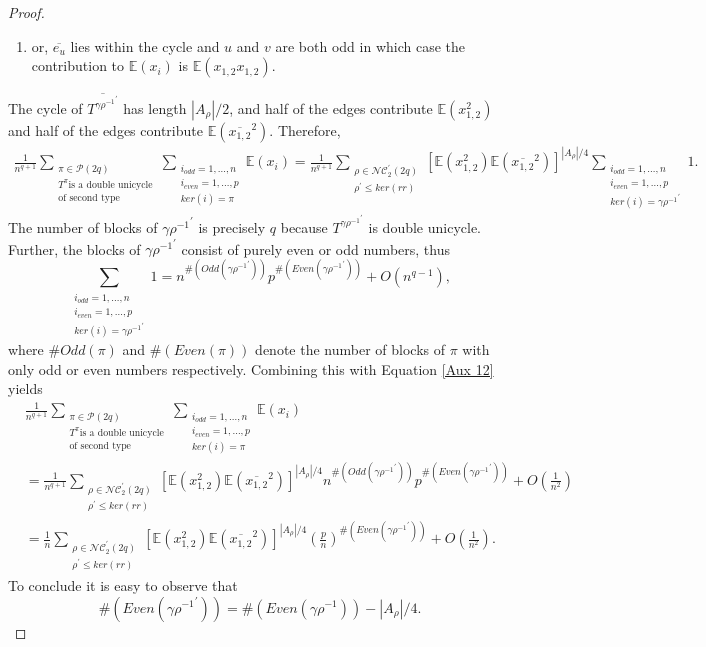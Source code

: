 \documentclass{article}
\theoremstyle{definition}
\newcommand{\E}{\mathbb{E}}
\newcommand{\cP}{\mathcal{P}}
\newcommand{\NC}{\mathcal{NC}}
\begin{document}
{\begin{proof}
\begin{enumerate}
    \item or, $\overline{e_u}$ lies within the cycle and $u$ and $v$ are both odd in which case the contribution to $\mathbb{E}(x_i)$ is $\mathbb{E}(x_{1,2}x_{1,2})$.
\end{enumerate}
The cycle of $\overline{T^{{\gamma\rho^{-1}}^\prime}}$ has length $|A_\rho|/2$, and half of the edges contribute $\mathbb{E}(x_{1,2}^2)$ and half of the edges contribute $\mathbb{E}(\overline{x_{1,2}}^2)$. Therefore,
\begin{align}\label{Aux 12}
\frac{1}{n^{q+1}}\sum_{\substack{\pi\in \cP(2q)\\ T^\pi \text{is a double unicycle} \\ \text{of second type} }}\sum_{\substack{i_{odd}=1,\dots,n \\ i_{even}=1,\dots,p \\ ker(i)=\pi}}\E(x_i) 
=\frac{1}{n^{q+1}}\sum_{\substack{\rho\in \NC_2^\prime(2q) \\ \rho^\prime \leq ker(rr)}}[\mathbb{E}(x_{1,2}^2)\mathbb{E}(\overline{x_{1,2}}^2)]^{|A_\rho|/4}\sum_{\substack{i_{odd}=1,\dots,n \\ i_{even}=1,\dots,p \\ ker(i)={\gamma\rho^{-1}}^\prime}}1.
\end{align}
The number of blocks of ${\gamma\rho^{-1}}^\prime$ is precisely $q$ because $T^{{\gamma\rho^{-1}}^\prime}$ is double unicycle. Further, the blocks of ${\gamma\rho^{-1}}^\prime$ consist of purely even or odd numbers, thus
$$\sum_{\substack{i_{odd}=1,\dots,n \\ i_{even}=1,\dots,p \\ ker(i)={\gamma\rho^{-1}}^\prime}}1=n^{\#(Odd({\gamma\rho^{-1}}^\prime))}p^{\#(Even({\gamma\rho^{-1}}^\prime))}+O(n^{q-1}),$$
where $\#Odd(\pi)$ and $\#(Even(\pi))$ denote the number of blocks of $\pi$ with only odd or even numbers respectively. Combining this with Equation \ref{Aux 12} yields 
\begin{align}\label{Aux 13}
&\frac{1}{n^{q+1}}\sum_{\substack{\pi\in \cP(2q)\\ T^\pi \text{is a double unicycle} \\ \text{of second type} }}\sum_{\substack{i_{odd}=1,\dots,n \\ i_{even}=1,\dots,p \\ ker(i)=\pi}}\E(x_i) \nonumber\\
&= 
\frac{1}{n^{q+1}}\sum_{\substack{\rho\in \NC_2^\prime(2q) \\ \rho^\prime \leq ker(rr)}}[\mathbb{E}(x_{1,2}^2)\mathbb{E}(\overline{x_{1,2}}^2)]^{|A_\rho|/4}n^{\#(Odd({\gamma\rho^{-1}}^\prime))}p^{\#(Even({\gamma\rho^{-1}}^\prime))}+O(\frac{1}{n^2}) \nonumber\\
&= \frac{1}{n}\sum_{\substack{\rho\in \NC_2^\prime(2q) \\ \rho^\prime \leq ker(rr)}}[\mathbb{E}(x_{1,2}^2)\mathbb{E}(\overline{x_{1,2}}^2)]^{|A_\rho|/4}\left(\frac{p}{n}\right)^{\#(Even({\gamma\rho^{-1}}^\prime))}+O(\frac{1}{n^2}).
\end{align}
To conclude it is easy to observe that
$$\#(Even({\gamma\rho^{-1}}^\prime))=\#(Even(\gamma\rho^{-1}))-|A_\rho|/4.$$
\end{proof}


}
\end{document}

